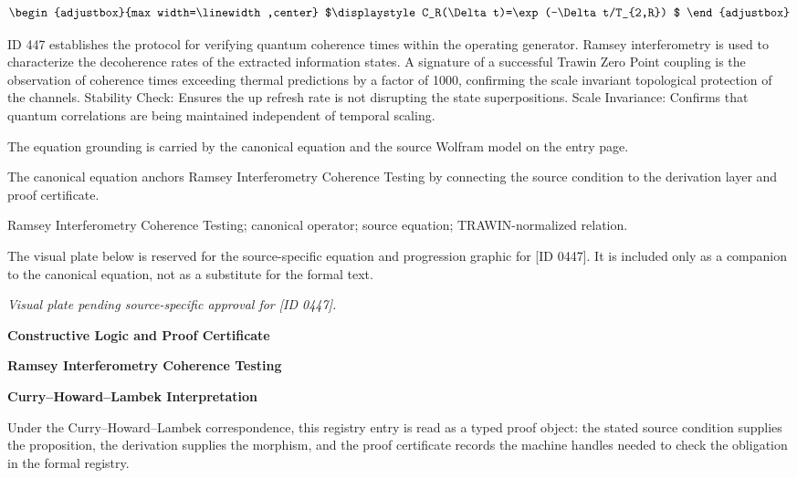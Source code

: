 \[
\begin{adjustbox}{max width=\linewidth,center}
$\displaystyle
C_R(\Delta t)=\exp(-\Delta t/T_{2,R})
$
\end{adjustbox}
\]

ID 447 establishes the protocol for verifying quantum coherence times within the operating generator. Ramsey interferometry is used to characterize the decoherence rates of the extracted information states. A signature of a successful Trawin Zero Point coupling is the observation of coherence times exceeding thermal predictions by a factor of 1000, confirming the scale invariant topological protection of the channels. Stability Check: Ensures the up refresh rate is not disrupting the state superpositions. Scale Invariance: Confirms that quantum correlations are being maintained independent of temporal scaling.

The equation grounding is carried by the canonical equation and the source Wolfram model on the entry page.

The canonical equation anchors Ramsey Interferometry Coherence Testing by connecting the source condition to the derivation layer and proof certificate.

Ramsey Interferometry Coherence Testing; canonical operator; source equation; TRAWIN-normalized relation.
\endgroup

\begingroup\footnotesize\sloppy
The visual plate below is reserved for the source-specific equation and progression graphic for [ID 0447]. It is included only as a companion to the canonical equation, not as a substitute for the formal text.
\par\endgroup
\begingroup\footnotesize\itshape
Visual plate pending source-specific approval for [ID 0447].
\par\endgroup

\clearpage
\begingroup\tzpsupportsetup
\noindent\textbf{\fontsize{10.8pt}{12.8pt}\selectfont [ID 0447] Constructive Logic and Proof Certificate}\par
\noindent\textbf{\fontsize{10pt}{12pt}\selectfont Ramsey Interferometry Coherence Testing}\par
\vspace{0.45em}
\begingroup
\footnotesize
\setlength{\parskip}{0.22em}
\setlength{\parindent}{0pt}
\noindent\textbf{Curry--Howard--Lambek Interpretation}\par
Under the Curry--Howard--Lambek correspondence, this registry entry is read as a typed proof
object: the stated source condition supplies the proposition, the derivation supplies the
morphism, and the proof certificate records the machine handles needed to check the obligation
in the formal registry.

